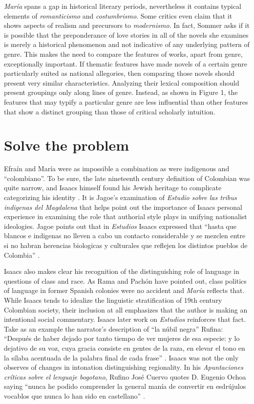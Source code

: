 \textit{María} spans a gap in historical literary periods, nevertheless it contains typical elements of \textit{romanticismo} and \textit{costumbrismo}.
Some critics even claim that it shows aspects of realism and precursors to \textit{modernismo}.
In fact, Sommer asks if it is possible that the preponderance of love stories in all of the novels she examines is merely a historical phenomenon and not indicative of any underlying pattern of genre.
This makes the need to compare the features of works, apart from genre, exceptionally important.
If thematic features have made novels of a certain genre particularly suited as national allegories, then comparing those novels should present very similar characteristics.
Analyzing their lexical composition should present groupings only along lines of genre.
Instead, as shown in Figure 1, the features that may typify a particular genre are less influential than other features that show a distinct grouping than those of critical scholarly intuition.


\section{Solve the problem}

Efraín and María were as impossible a combination as were indigenous and \enquote{colombiano}.
To be sure, the late nineteenth century definition of Colombian was quite narrow, and Isaacs himself found his Jewish heritage to complicate categorizing his identity \autocite[160]{Jagoe2003}.
It is Jagoe's examination of \textit{Estudio sobre las tribus indigenas del Magdalena} that helps point out the importance of Isaacs personal experience in examining the role that authorial style plays in unifying nationalist ideologies. 
Jagoe points out that in \textit{Estudios} Isaacs expressed that \enquote{hasta que blancos e indigenas no lleven a cabo un contacto considerable y se mezclen entre si no habran herencias biologicas y culturales que reflejen los distintos pueblos de Colombia} \autocite[160]{Jagoe2003}.


Isaacs also makes clear his recognition of the distinguishing role of language in questions of class and race.
As Rama and Pachón have pointed out, class politics of language in former Spanish colonies were no accident and \textit{María} reflects that.
While Isaacs tends to idealize the linguistic stratification of 19th century Colombian society, their inclusion at all emphasizes that the author is making an intentional social commentary.
Isaacs later work on \textit{Estudios} reinforces that fact.
Take as an example the narrator's description of \enquote{la núbil negra} Rufina:
\enquote{Después de haber dejado por tanto tiempo de ver mujeres de esa especie: y lo dejativo de su voz, cuya gracia consiste en gentes de la raza, en elevar el tono en la sílaba acentuada de la palabra final de cada frase} \autocite[304]{Isaacs2012}.
Isaacs was not the only observes of changes in intonation distinguishing regionality.
In his \textit{Apuntaciones críticas sobre el lenguaje bogotano}, Rufino José Cuervo quotes D. Eugenio Ochoa saying \enquote{nunca he podido comprender la general manía de convertir en esdrújulos vocablos que nunca lo han sido en castellano} \autocite[3]{Cuervo1876}.


